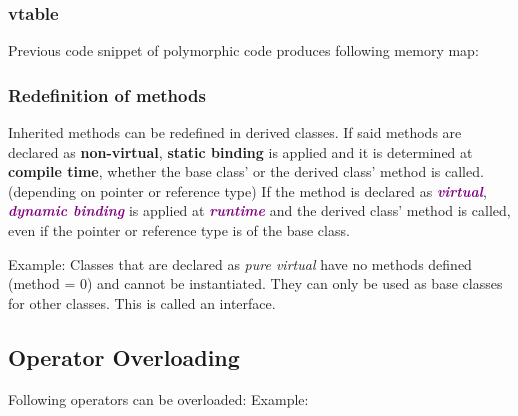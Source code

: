 \subsubsection{vtable}
    \vspace{-2mm}
    \vspace{-2mm}
    Previous code snippet of polymorphic code produces following memory map:
    \begin{center}
        
    \end{center}

\subsubsection{Redefinition of methods}
    Inherited methods can be redefined in derived classes. If said methods are declared as \textcolor{cactgreen}{\textbf{non-virtual}}, \textcolor{cactgreen}{\textbf{static binding}} is applied and it is determined at \textcolor{cactgreen}{\textbf{compile time}}, whether the base class' or the derived class' method is called. (depending on pointer or reference type)\newline
    If the method is declared as \textcolor{purple}{\textit{\textbf{virtual}}}, \textcolor{purple}{\textit{\textbf{dynamic binding}}} is applied at \textcolor{purple}{\textit{\textbf{runtime}}} and the derived class' method is called, even if the pointer or reference type is of the base class.

    Example:
    \vspace{-2mm}
    \vspace{-2mm}
    Classes that are declared as \textit{pure virtual} have no methods defined (method = 0) and cannot be instantiated. They can only be used as base classes for other classes. This is called an interface.

\subsection{Operator Overloading}
    Following operators can be overloaded:
    \vspace{-2mm}
    \vspace{-2mm}
    Example:
    \vspace{-2mm}
    \vspace{-2mm}
